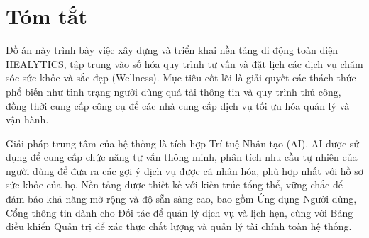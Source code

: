\section*{Tóm tắt}

\hspace*{0.63cm}Đồ án này trình bày việc xây dựng và triển khai nền tảng di động toàn diện HEALYTICS, tập trung vào số hóa quy trình tư vấn và đặt lịch các dịch vụ chăm sóc sức khỏe và sắc đẹp (Wellness). Mục tiêu cốt lõi là giải quyết các thách thức phổ biến như tình trạng người dùng quá tải thông tin và quy trình thủ công, đồng thời cung cấp công cụ để các nhà cung cấp dịch vụ tối ưu hóa quản lý và vận hành.

\hspace*{0.63cm}Giải pháp trung tâm của hệ thống là tích hợp Trí tuệ Nhân tạo (AI). AI được sử dụng để cung cấp chức năng tư vấn thông minh, phân tích nhu cầu tự nhiên của người dùng để đưa ra các gợi ý dịch vụ được cá nhân hóa, phù hợp nhất với hồ sơ sức khỏe của họ. Nền tảng được thiết kế với kiến trúc tổng thể, vững chắc để đảm bảo khả năng mở rộng và độ sẵn sàng cao, bao gồm Ứng dụng Người dùng, Cổng thông tin dành cho Đối tác để quản lý dịch vụ và lịch hẹn, cùng với Bảng điều khiển Quản trị để xác thực chất lượng và quản lý tài chính toàn hệ thống.

\clearpage


